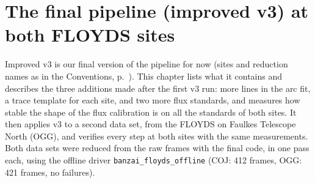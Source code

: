 \chapter{The final pipeline (improved v3) at both FLOYDS sites}
\label{sec:sites}

Improved v3 is our final version of the pipeline for now (sites and reduction names as in
the Conventions, p.~\pageref{sec:conventions}). This chapter lists what it contains and describes the three additions made after the
first v3 run: more lines in the arc fit, a trace template for each site, and two more flux standards, and measures how
stable the shape of the flux calibration is on all the standards of both sites. It then applies
v3 to a second data set, from the FLOYDS on Faulkes Telescope North (OGG), and verifies every step at both sites with
the same measurements. Both data sets were reduced from the raw frames with the final code, in one pass each, using
the offline driver \texttt{banzai\_floyds\_offline} (COJ: 412 frames, OGG: 421 frames, no failures).

